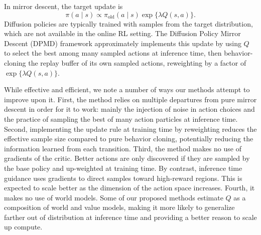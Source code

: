 \documentclass{article}
\theoremstyle{plain}
\theoremstyle{definition}
\theoremstyle{remark}
\begin{document}
In mirror descent, the target update is 
\begin{equation}
  \pi(a\mid s) \propto \pi_\mathrm{old}(a\mid s) \exp\{\lambda Q(s,a)\}.
  \label{eq:md-tilt}
\end{equation}
Diffusion policies are typically trained with samples from the target distribution, which are not available in the online RL setting.
The Diffusion Policy Mirror Descent (DPMD) framework \citep{ma2025soft} approximately implements this update by using $Q$ to select the best among many sampled actions at inference time, then behavior-cloning the replay buffer of its own sampled actions, reweighting by a factor of $\exp\{\lambda Q(s,a)\}$.

While effective and efficient, we note a number of ways our methods attempt to improve upon it.
First, the method relies on multiple departures from pure mirror descent in order for it to work: mainly the injection of noise in action choices and the practice of sampling the best of many action particles at inference time.
Second, implementing the update rule at training time by reweighting reduces the effective sample size compared to pure behavior cloning, potentially reducing the information learned from each transition. 
Third, the method makes no use of gradients of the critic. Better actions are only discovered if they are sampled by the base policy and up-weighted at training time. By contrast, inference time guidance uses gradients to direct samples toward high-reward regions. This is expected to scale better as the dimension of the action space increases.
Fourth, it makes no use of world models. Some of our proposed methods estimate $Q$ as a composition of world and value models, making it more likely to generalize farther out of distribution at inference time and providing a better reason to scale up compute. 
\end{document}

